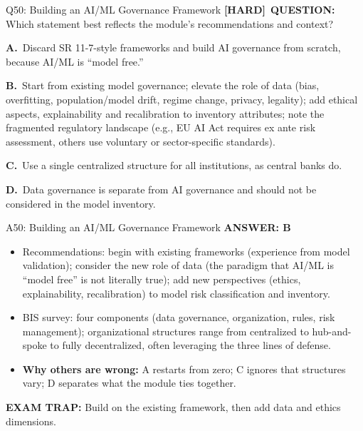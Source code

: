 \documentclass[8pt]{beamer}
\newcommand{\fs}{\fontsize{10}{12}\selectfont}
\newcommand{\opts}[4]{\par\vspace{0.12cm}\noindent\textbf{A.}~#1\par\vspace{0.08cm}\noindent\textbf{B.}~#2\par\vspace{0.08cm}\noindent\textbf{C.}~#3\par\vspace{0.08cm}\noindent\textbf{D.}~#4\par}
\newcommand{\ans}[1]{\textcolor{myblue}{\textbf{ANSWER: #1}}}
\newcommand{\trap}[1]{\textcolor{myred}{\textbf{EXAM TRAP:}} #1}
\newcommand{\hard}{\textcolor{myorange}{\textbf{[HARD]}}}
\begin{document}
\begin{frame}[t]{Q50: Building an AI/ML Governance Framework}
\fs
\hard\ \textbf{QUESTION:} Which statement best reflects the module's recommendations and context?
\opts{Discard SR 11-7-style frameworks and build AI governance from scratch, because AI/ML is ``model free.''}
{Start from existing model governance; elevate the role of data (bias, overfitting, population/model drift, regime change, privacy, legality); add ethical aspects, explainability and recalibration to inventory attributes; note the fragmented regulatory landscape (e.g., EU AI Act requires ex ante risk assessment, others use voluntary or sector-specific standards).}
{Use a single centralized structure for all institutions, as central banks do.}
{Data governance is separate from AI governance and should not be considered in the model inventory.}
\end{frame}

\begin{frame}[t]{A50: Building an AI/ML Governance Framework}
\fs
\ans{B}
\begin{itemize}
\item Recommendations: begin with existing frameworks (experience from model validation); consider the new role of data (the paradigm that AI/ML is ``model free'' is not literally true); add new perspectives (ethics, explainability, recalibration) to model risk classification and inventory.
\item BIS survey: four components (data governance, organization, rules, risk management); organizational structures range from centralized to hub-and-spoke to fully decentralized, often leveraging the three lines of defense.
\item \textbf{Why others are wrong:} A restarts from zero; C ignores that structures vary; D separates what the module ties together.
\end{itemize}
\trap{Build on the existing framework, \textcolor{myblue}{then} add data and ethics dimensions.}
\end{frame}
\end{document}
